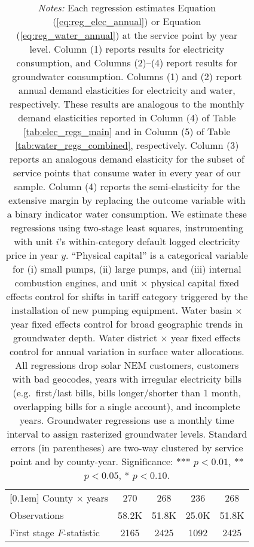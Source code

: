\begin{table}[t!]
\begin{adjustbox}{center}
\begin{tabular}{lcccc}
[0.1em] 
County $\times$ years  & 270 & 268 & 236 & 268 \\ 
[0.1em] 
Observations & 58.2K  & 51.8K & 25.0K & 51.8K \\ 
[0.1em] 
First stage $F$-statistic & 2165  & 2425 & 1092 & 2425 \\ 
[0.15em]
\hline
\end{tabular}
\end{adjustbox}
\captionsetup{width=\textwidth}
\caption*{\scriptsize \emph{Notes:} Each regression estimates Equation (\ref{eq:reg_elec_annual}) or Equation (\ref{eq:reg_water_annual}) at the service point by year level.
Column (1) reports results for electricity consumption, and Columns (2)--(4) report results for groundwater consumption.
Columns (1) and (2) report annual demand elasticities for electricity and water, respectively. These results are analogous to the monthly demand elasticities reported 
in Column (4) of Table \ref{tab:elec_regs_main} and in Column (5) of Table \ref{tab:water_regs_combined}, respectively.
Column (3) reports an analogous demand elasticity for the subset of service points that consume water in every year of our sample.
Column (4) reports the semi-elasticity for the extensive margin by replacing the outcome variable with a binary indicator water consumption.
We estimate these regressions using two-stage least squares, instrumenting with unit $i$'s within-category default logged electricity price in year $y$.
``Physical capital'' is a categorical variable for (i) small pumps, (ii) large pumps, and (iii) internal combustion engines, and unit $\times$
physical capital fixed effects control for shifts in tariff category triggered by the installation of new pumping equipment.
Water basin $\times$ year fixed effects control for broad geographic trends in groundwater depth.
Water district $\times$ year fixed effects control for annual variation in surface water allocations.
All regressions drop solar NEM customers, customers with bad geocodes, years with irregular electricity bills
(e.g.\ first/last bills, bills longer/shorter than 1 month, overlapping bills for a single account), and incomplete years.
Groundwater regressions use a monthly time interval to assign rasterized groundwater levels.
Standard errors (in parentheses) are two-way clustered by service point and by county-year.
Significance: *** $p < 0.01$, ** $p < 0.05$, * $p < 0.10$.
}
\end{table}
